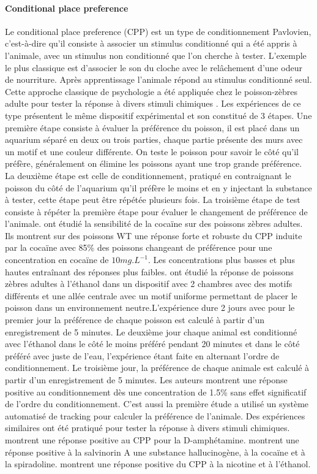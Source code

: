   \paragraph{Conditional place preference}
  Le conditional place preference (CPP) est un type de conditionnement Pavlovien, c’est-à-dire qu'il consiste à associer un stimulus conditionné qui a été appris à l'animale, avec un stimulus non conditionné que l'on cherche à tester. L'exemple le plus classique est d'associer le son du cloche avec le relâchement d'une odeur de nourriture. Après apprentissage l'animale répond au stimulus conditionné seul.
  Cette approche classique de psychologie a été appliquée chez le poisson-zèbres adulte pour tester la réponse à divers stimuli chimiques \cite{mathur2011conditioned}. Les expériences de ce type présentent le même dispositif expérimental et son constitué de 3 étapes. Une première étape consiste à évaluer la préférence du poisson, il est placé dans un aquarium séparé en deux ou trois parties, chaque partie présente des murs avec un motif et une couleur différente. On teste le poisson pour savoir le côté qu'il préfère, généralement on élimine les poissons ayant une trop grande préférence. La deuxième étape est celle de conditionnement, pratiqué en contraignant le poisson du côté de l'aquarium qu'il préfère le moins et en y injectant la substance à tester, cette étape peut être répétée plusieurs fois. La troisième étape de test consiste à répéter la première étape pour évaluer le changement de préférence de l'animale.
  \cite{darland2001behavioral} ont étudié la sensibilité de la cocaïne sur des poissons zèbres adultes. Ils montrent sur des poissons WT une réponse forte et robuste du CPP induite par la cocaïne avec 85\% des poissons changeant de préférence pour une concentration en cocaïne de $10mg.L^{-1}$. Les concentrations plus basses et plus hautes entraînant des réponses plus faibles. \cite{mathur2011preference} ont étudié la réponse de poissons zèbres adultes à l'éthanol dans un dispositif avec 2 chambres avec des motifs différents et une allée centrale avec un motif uniforme permettant de placer le poisson dans un environnement neutre.L'expérience dure 2 jours avec pour le premier jour la préférence de chaque poisson est calculé à partir d'un enregistrement de 5 minutes. Le deuxième jour chaque animal est conditionné avec l'éthanol dans le côté le moins préféré pendant 20 minutes et dans le côté préféré avec juste de l'eau, l'expérience étant faite en alternant l'ordre de conditionnement. Le troisième jour, la préférence de chaque animale est calculé à partir d'un enregistrement de 5 minutes. Les auteurs montrent une réponse positive au conditionnement dès une concentration de 1.5\% sans effet significatif de l'ordre du conditionnement. C'est aussi la première étude a utilisé un système automatisé de tracking pour calculer la préférence de l'animale. Des expériences similaires ont été pratiqué pour tester la réponse à divers stimuli chimiques. \cite{ninkovic2006genetic, ninkovic2006zebrafish} montrent une réponse positive au CPP pour la D-amphétamine. \cite{braida2007hallucinatory} montrent une réponse positive à la salvinorin A une substance hallucinogène, à la cocaïne et à la spiradoline. \cite{kedikian2013behavioral, } montrent une réponse positive du CPP à la nicotine et à l'éthanol.
